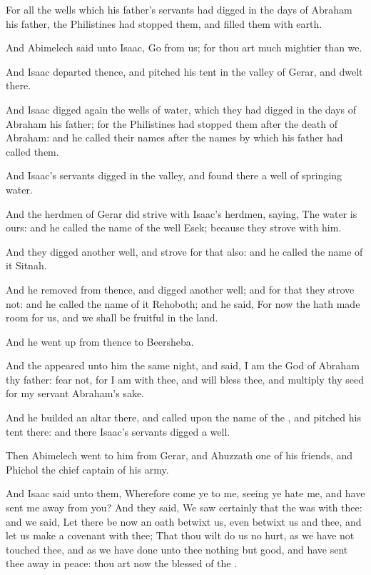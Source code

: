 \verse For all the wells which his father's servants had digged in the days of Abraham his father, the Philistines had stopped them, and filled them with earth.

\verse And Abimelech said unto Isaac, Go from us; for thou art much mightier than we.

\verse And Isaac departed thence, and pitched his tent in the valley of Gerar, and dwelt there.

\verse And Isaac digged again the wells of water, which they had digged in the days of Abraham his father; for the Philistines had stopped them after the death of Abraham: and he called their names after the names by which his father had called them.

\verse And Isaac's servants digged in the valley, and found there a well of springing water.

\verse And the herdmen of Gerar did strive with Isaac's herdmen, saying, The water is ours: and he called the name of the well Esek; because they strove with him.

\verse And they digged another well, and strove for that also: and he called the name of it Sitnah.

\verse And he removed from thence, and digged another well; and for that they strove not: and he called the name of it Rehoboth; and he said, For now the \LORD hath made room for us, and we shall be fruitful in the land.

\verse And he went up from thence to Beersheba.

\verse And the \LORD appeared unto him the same night, and said, I am the God of Abraham thy father: fear not, for I am with thee, and will bless thee, and multiply thy seed for my servant Abraham's sake.

\verse And he builded an altar there, and called upon the name of the \LORD, and pitched his tent there: and there Isaac's servants digged a well.

\verse Then Abimelech went to him from Gerar, and Ahuzzath one of his friends, and Phichol the chief captain of his army.

\verse And Isaac said unto them, Wherefore come ye to me, seeing ye hate me, and have sent me away from you?  \verse And they said, We saw certainly that the \LORD was with thee: and we said, Let there be now an oath betwixt us, even betwixt us and thee, and let us make a covenant with thee; \verse That thou wilt do us no hurt, as we have not touched thee, and as we have done unto thee nothing but good, and have sent thee away in peace: thou art now the blessed of the \LORD.

